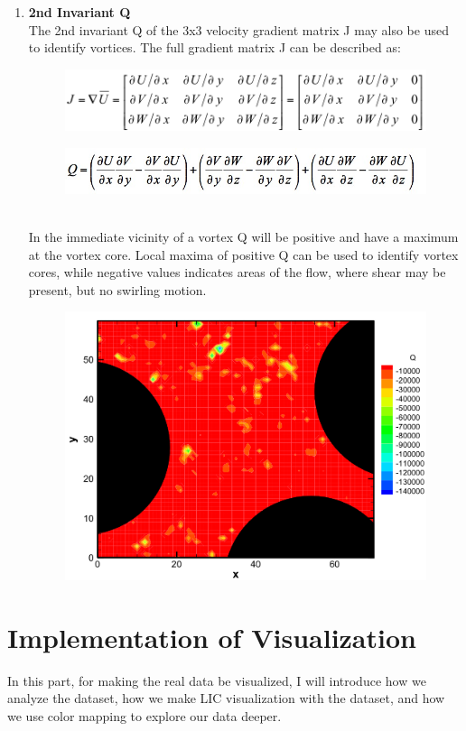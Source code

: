\documentclass[letterpaper,12pt,titlepage,fleqn]{article}
\begin{document}
\begin{CJK}{UTF8}{gkai}
\begin{enumerate}
\item \textbf{2nd Invariant Q}\\
The 2nd invariant Q of the 3x3 velocity gradient matrix J may also be used to identify vortices. The full gradient matrix J can be described as:\\
\begin{figure}[h]
	\centering
	\includegraphics[width= 0.8\linewidth ]{pic11.png}
\end{figure}
\begin{figure}[h]
	\centering
	\includegraphics[width= 0.8\linewidth ]{pic12.jpg}
\end{figure}
\\In the immediate vicinity of a vortex Q will be positive and have a maximum at the vortex core. Local maxima of positive Q can be used to identify vortex cores, while negative values indicates areas of the flow, where shear may be present, but no swirling motion.

\begin{figure}[h]
	\centering
	\includegraphics[width= 0.8\linewidth ]{pic13.png}
\end{figure}

\end{enumerate}

\section{Implementation of Visualization}
In this part, for making the real data be visualized, I will introduce how we analyze the dataset, how we make LIC visualization with the dataset, and how we use color mapping to explore our data deeper. 


\end{CJK}
\end{document}
